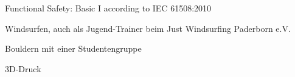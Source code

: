 \documentclass[12pt, a4paper]{awsome-cv-timeline}
\renewcommand{\sectioninterskip}{2mm}
\begin{document}
\begin{textblock*}{\leftcolumnwidth}
			\vspace{-1ex}
			\begin{cvitems}
				\item Functional Safety: Basic I according to IEC 61508:2010
			\end{cvitems}

	\vspace{\sectioninterskip}
		\vspace{-1ex}
		\begin{cvitems}
			\item Windsurfen, auch als Jugend-Trainer beim Just Windsurfing Paderborn e.V.
			\item Bouldern mit einer Studentengruppe
			\item 3D-Druck
		\end{cvitems}

\end{textblock*}

\end{document}
